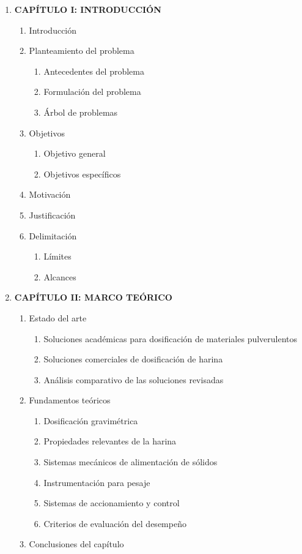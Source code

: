 \begin{enumerate}
    \item \textbf{CAPÍTULO I: INTRODUCCIÓN}
    \begin{enumerate}
        \item Introducción
        \item Planteamiento del problema
        \begin{enumerate}
            \item Antecedentes del problema
            \item Formulación del problema
            \item Árbol de problemas
        \end{enumerate}
        \item Objetivos
        \begin{enumerate}
            \item Objetivo general
            \item Objetivos específicos
        \end{enumerate}
        \item Motivación
        \item Justificación
        \item Delimitación
        \begin{enumerate}
            \item Límites
            \item Alcances
        \end{enumerate}
    \end{enumerate}

    \item \textbf{CAPÍTULO II: MARCO TEÓRICO}
    \begin{enumerate}
        \item Estado del arte
        \begin{enumerate}
            \item Soluciones académicas para dosificación de materiales pulverulentos
            \item Soluciones comerciales de dosificación de harina
            \item Análisis comparativo de las soluciones revisadas
        \end{enumerate}
        \item Fundamentos teóricos
        \begin{enumerate}
            \item Dosificación gravimétrica
            \item Propiedades relevantes de la harina
            \item Sistemas mecánicos de alimentación de sólidos
            \item Instrumentación para pesaje
            \item Sistemas de accionamiento y control
            \item Criterios de evaluación del desempeño
        \end{enumerate}
        \item Conclusiones del capítulo
    \end{enumerate}


\end{enumerate}
